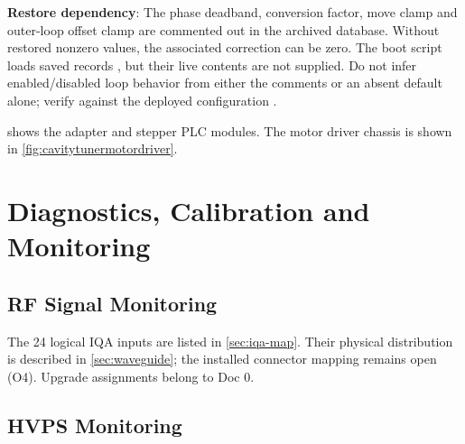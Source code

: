 \begin{keynote}
\textbf{Restore dependency}: The phase deadband, conversion factor, move clamp and outer-loop offset clamp are commented out in the archived database. Without restored nonzero values, the associated correction can be zero. The boot script loads saved records , but their live contents are not supplied. Do not infer enabled/disabled loop behavior from either the comments or an absent default alone; verify against the deployed configuration .
\end{keynote}

 shows the adapter and stepper PLC modules.  The motor driver chassis is shown in \cref{fig:cavitytunermotordriver}.




\section{Diagnostics, Calibration and Monitoring}\label{sec:diagnostics}

\subsection{RF Signal Monitoring}

The 24 logical IQA inputs are listed in \cref{sec:iqa-map}. Their physical distribution is described in \cref{sec:waveguide}; the installed connector mapping remains open (O4). Upgrade assignments belong to Doc 0.

\subsection{HVPS Monitoring}

